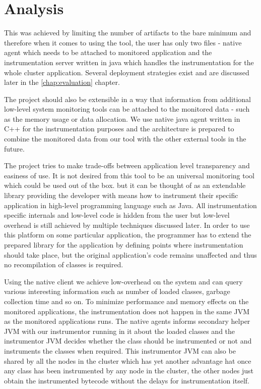 \chapter{Analysis}

This was achieved by limiting the number of artifacts to the bare minimum and therefore when it comes to using the tool, the user has only two files - native agent which needs to be attached to monitored application and the instrumentation server written in java which handles the instrumentation for the whole cluster application. Several deployment strategies exist and are discussed later in the \ref{chap:evaluation} chapter.

The project should also be extensible in a way that information from additional low-level system monitoring tools can be attached to the monitored data - such as the memory usage or data allocation. We use native java agent written in C++ for the instrumentation purposes and the architecture is prepared to combine the monitored data from our tool with the other external tools in the future.  

The project tries to make trade-offs between application level transparency and easiness of use. It is not desired from this tool to be an universal monitoring tool which could be used out of the box. but it can be thought of as an extendable library providing the developer with means how to instrument their specific application in high-level programming language such as Java. All instrumentation specific internals and low-level code is hidden from the user but low-level overhead is still achieved by multiple techniques discussed later. In order to use this platform on some particular application, the programmer has to extend the prepared library for the application by defining points where instrumentation should take place, but the original application's code remains unaffected and thus no recompilation of classes is required.


Using the native client we achieve low-overhead on the system and can query various interesting information such as number of loaded classes, garbage collection time and so on. To minimize performance and memory effects on the monitored applications, the instrumentation does not happen in the same JVM as the monitored applications runs. The native agents informs secondary helper JVM with our instrumentor running in it about the loaded classes and the instrumentor JVM decides whether the class should be instrumented or not and instruments the classes when required. This instrumentor JVM can also be shared by all the nodes in the cluster which has yet another advantage hat once any class has been instrumented by any node in the cluster, the other nodes just obtain the instrumented bytecode without the delays for instrumentation itself.


